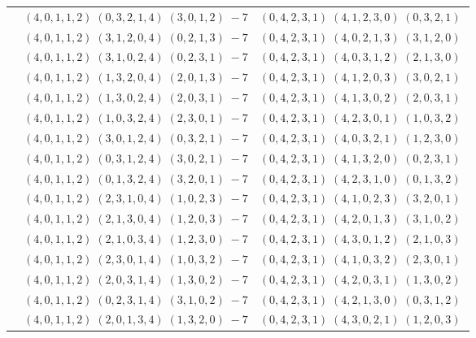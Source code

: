 \documentclass[11pt]{article}
\begin{document}
\begin{longtable}[l]{|c|c|c|}
 \cline{2-3} 
 & $(4 ,0 ,1 ,1 ,2) \;(0 ,3 ,2 ,1 ,4) \;(3 ,0 ,1 ,2) \;-7$ & $(0 ,4 ,2 ,3 ,1) \;(4 ,1 ,2 ,3 ,0) \;(0 ,3 ,2 ,1) \;$\\ 
 \cline{2-3} 
 & $(4 ,0 ,1 ,1 ,2) \;(3 ,1 ,2 ,0 ,4) \;(0 ,2 ,1 ,3) \;-7$ & $(0 ,4 ,2 ,3 ,1) \;(4 ,0 ,2 ,1 ,3) \;(3 ,1 ,2 ,0) \;$\\ 
 \cline{2-3} 
 & $(4 ,0 ,1 ,1 ,2) \;(3 ,1 ,0 ,2 ,4) \;(0 ,2 ,3 ,1) \;-7$ & $(0 ,4 ,2 ,3 ,1) \;(4 ,0 ,3 ,1 ,2) \;(2 ,1 ,3 ,0) \;$\\ 
 \cline{2-3} 
 & $(4 ,0 ,1 ,1 ,2) \;(1 ,3 ,2 ,0 ,4) \;(2 ,0 ,1 ,3) \;-7$ & $(0 ,4 ,2 ,3 ,1) \;(4 ,1 ,2 ,0 ,3) \;(3 ,0 ,2 ,1) \;$\\ 
 \cline{2-3} 
 & $(4 ,0 ,1 ,1 ,2) \;(1 ,3 ,0 ,2 ,4) \;(2 ,0 ,3 ,1) \;-7$ & $(0 ,4 ,2 ,3 ,1) \;(4 ,1 ,3 ,0 ,2) \;(2 ,0 ,3 ,1) \;$\\ 
 \cline{2-3} 
 & $(4 ,0 ,1 ,1 ,2) \;(1 ,0 ,3 ,2 ,4) \;(2 ,3 ,0 ,1) \;-7$ & $(0 ,4 ,2 ,3 ,1) \;(4 ,2 ,3 ,0 ,1) \;(1 ,0 ,3 ,2) \;$\\ 
 \cline{2-3} 
 & $(4 ,0 ,1 ,1 ,2) \;(3 ,0 ,1 ,2 ,4) \;(0 ,3 ,2 ,1) \;-7$ & $(0 ,4 ,2 ,3 ,1) \;(4 ,0 ,3 ,2 ,1) \;(1 ,2 ,3 ,0) \;$\\ 
 \cline{2-3} 
 & $(4 ,0 ,1 ,1 ,2) \;(0 ,3 ,1 ,2 ,4) \;(3 ,0 ,2 ,1) \;-7$ & $(0 ,4 ,2 ,3 ,1) \;(4 ,1 ,3 ,2 ,0) \;(0 ,2 ,3 ,1) \;$\\ 
 \cline{2-3} 
 & $(4 ,0 ,1 ,1 ,2) \;(0 ,1 ,3 ,2 ,4) \;(3 ,2 ,0 ,1) \;-7$ & $(0 ,4 ,2 ,3 ,1) \;(4 ,2 ,3 ,1 ,0) \;(0 ,1 ,3 ,2) \;$\\ 
 \cline{2-3} 
 & $(4 ,0 ,1 ,1 ,2) \;(2 ,3 ,1 ,0 ,4) \;(1 ,0 ,2 ,3) \;-7$ & $(0 ,4 ,2 ,3 ,1) \;(4 ,1 ,0 ,2 ,3) \;(3 ,2 ,0 ,1) \;$\\ 
 \cline{2-3} 
 & $(4 ,0 ,1 ,1 ,2) \;(2 ,1 ,3 ,0 ,4) \;(1 ,2 ,0 ,3) \;-7$ & $(0 ,4 ,2 ,3 ,1) \;(4 ,2 ,0 ,1 ,3) \;(3 ,1 ,0 ,2) \;$\\ 
 \cline{2-3} 
 & $(4 ,0 ,1 ,1 ,2) \;(2 ,1 ,0 ,3 ,4) \;(1 ,2 ,3 ,0) \;-7$ & $(0 ,4 ,2 ,3 ,1) \;(4 ,3 ,0 ,1 ,2) \;(2 ,1 ,0 ,3) \;$\\ 
 \cline{2-3} 
 & $(4 ,0 ,1 ,1 ,2) \;(2 ,3 ,0 ,1 ,4) \;(1 ,0 ,3 ,2) \;-7$ & $(0 ,4 ,2 ,3 ,1) \;(4 ,1 ,0 ,3 ,2) \;(2 ,3 ,0 ,1) \;$\\ 
 \cline{2-3} 
 & $(4 ,0 ,1 ,1 ,2) \;(2 ,0 ,3 ,1 ,4) \;(1 ,3 ,0 ,2) \;-7$ & $(0 ,4 ,2 ,3 ,1) \;(4 ,2 ,0 ,3 ,1) \;(1 ,3 ,0 ,2) \;$\\ 
 \cline{2-3} 
 & $(4 ,0 ,1 ,1 ,2) \;(0 ,2 ,3 ,1 ,4) \;(3 ,1 ,0 ,2) \;-7$ & $(0 ,4 ,2 ,3 ,1) \;(4 ,2 ,1 ,3 ,0) \;(0 ,3 ,1 ,2) \;$\\ 
 \cline{2-3} 
 & $(4 ,0 ,1 ,1 ,2) \;(2 ,0 ,1 ,3 ,4) \;(1 ,3 ,2 ,0) \;-7$ & $(0 ,4 ,2 ,3 ,1) \;(4 ,3 ,0 ,2 ,1) \;(1 ,2 ,0 ,3) \;$\\ 

\end{longtable}
\end{document}
